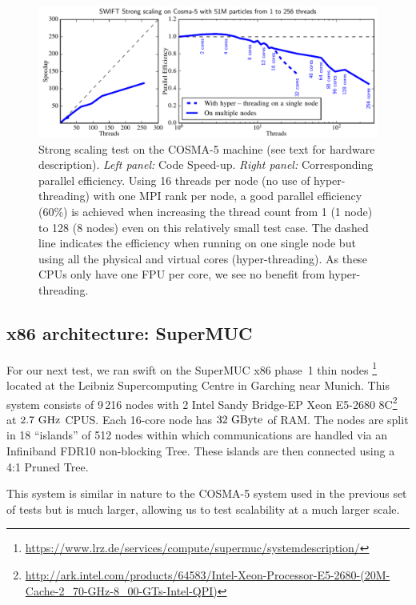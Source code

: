 \documentclass{sig-alternate-05-2015}
\newcommand{\swift}{{\sc swift}\xspace}
\begin{document}
\begin{figure}
\centering
\includegraphics[width=\textwidth]{Figures/scalingCosma}
\caption{Strong scaling test on the COSMA-5 machine (see text for hardware
  description). \textit{Left panel:} Code Speed-up. \textit{Right panel:}
  Corresponding parallel efficiency.  Using 16 threads per node (no use of
  hyper-threading) with one MPI rank per node, a good parallel efficiency (60\%)
  is achieved when increasing the thread count from 1 (1 node) to 128 (8 nodes)
  even on this relatively small test case. The dashed line indicates the
  efficiency when running on one single node but using all the physical and
  virtual cores (hyper-threading). As these CPUs only have one FPU per core, we
  see no benefit from hyper-threading.
  \label{fig:cosma}}
\end{figure}



\subsection{x86 architecture: SuperMUC}

For our next test, we ran \swift on the SuperMUC x86 phase~1 thin
nodes \footnote{\url{https://www.lrz.de/services/compute/supermuc/systemdescription/}}
located at the Leibniz Supercomputing Centre in Garching near Munich. This
system consists of 9\,216 nodes with 2 Intel Sandy Bridge-EP Xeon E5-2680
8C\footnote{\url{http://ark.intel.com/products/64583/Intel-Xeon-Processor-E5-2680-(20M-Cache-2_70-GHz-8_00-GTs-Intel-QPI)}}
at $2.7~\rm{GHz}$ CPUS. Each 16-core node has $32~\rm{GByte}$ of RAM.
The nodes are split in 18
``islands'' of 512 nodes within which communications are handled via an
Infiniband FDR10 non-blocking Tree. These islands are then connected using a 4:1
Pruned Tree.

This system is similar in nature to the COSMA-5 system used in the previous set
of tests but is much larger, allowing us to test scalability at a much larger
scale.
\end{document}
